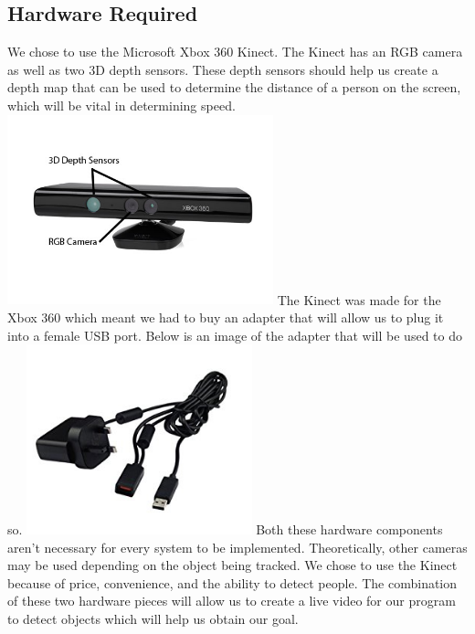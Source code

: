\documentclass[onecolumn, draftclsnofoot,10pt, compsoc]{IEEEtran}
\begin{document}
\subsection{Hardware Required}
We chose to use the Microsoft Xbox 360 Kinect. The Kinect has an RGB camera as well as two 3D depth sensors. These depth sensors should help us create a depth map that can be used to determine the distance of a person on the screen, which will be vital in determining speed.
\newline
\includegraphics[height=5.5cm]{kinect1.jpg}
\newline
The Kinect was made for the Xbox 360 which meant we had to buy an adapter that will allow us to plug it into a female USB port. Below is an image of the adapter that will be used to do so.
\newline
\includegraphics[height=5.5cm]{adapter.jpg}
\newline
Both these hardware components aren't necessary for every system to be implemented.
Theoretically, other cameras may be used depending on the object being tracked.
We chose to use the Kinect because of price, convenience, and the ability to detect people.
The combination of these two hardware pieces will allow us to create a live video for our program to detect objects which will help us obtain our goal.
\end{document}
